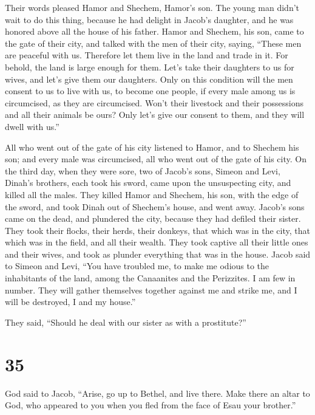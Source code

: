  Their words pleased Hamor and Shechem, Hamor's son.
 The young man didn't wait to do this thing, because he
had delight in Jacob's daughter, and he was honored above all the house
of his father.  Hamor and Shechem, his son, came to the
gate of their city, and talked with the men of their city, saying,
 ``These men are peaceful with us. Therefore let them
live in the land and trade in it. For behold, the land is large enough
for them. Let's take their daughters to us for wives, and let's give
them our daughters.  Only on this condition will the men
consent to us to live with us, to become one people, if every male among
us is circumcised, as they are circumcised.  Won't their
livestock and their possessions and all their animals be ours? Only
let's give our consent to them, and they will dwell with us.''

 All who went out of the gate of his city listened to
Hamor, and to Shechem his son; and every male was circumcised, all who
went out of the gate of his city.  On the third day, when
they were sore, two of Jacob's sons, Simeon and Levi, Dinah's brothers,
each took his sword, came upon the unsuspecting city, and killed all the
males.  They killed Hamor and Shechem, his son, with the
edge of the sword, and took Dinah out of Shechem's house, and went away.
 Jacob's sons came on the dead, and plundered the city,
because they had defiled their sister.  They took their
flocks, their herds, their donkeys, that which was in the city, that
which was in the field,  and all their wealth. They took
captive all their little ones and their wives, and took as plunder
everything that was in the house.  Jacob said to Simeon
and Levi, ``You have troubled me, to make me odious to the inhabitants
of the land, among the Canaanites and the Perizzites. I am few in
number. They will gather themselves together against me and strike me,
and I will be destroyed, I and my house.''

 They said, ``Should he deal with our sister as with a
prostitute?''

\hypertarget{section-34}{%
\section{35}\label{section-34}}

 God said to Jacob, ``Arise, go up to Bethel, and live
there. Make there an altar to God, who appeared to you when you fled
from the face of Esau your brother.''

